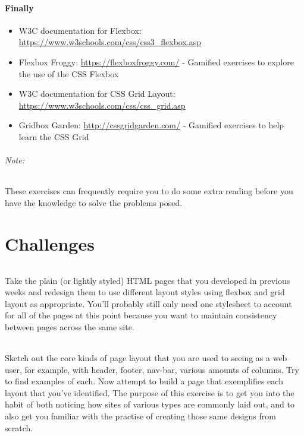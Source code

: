 \documentclass[10pt, a4paper]{article}
\begin{document}
\subsection*{Finally}
\begin{itemize}
\item W3C documentation for Flexbox: \url{https://www.w3schools.com/css/css3_flexbox.asp}
\item Flexbox Froggy: \url{https://flexboxfroggy.com/} - Gamified exercises to explore the use of the CSS Flexbox
\item W3C documentation for CSS Grid Layout: \url{https://www.w3schools.com/css/css_grid.asp}
\item Gridbox Garden: \url{http://cssgridgarden.com/} - Gamified exercises to help learn the CSS Grid
\end{itemize}

\paragraph{Note:} These exercises can frequently require you to do some extra reading before you have the knowledge to solve the problems posed.




\clearpage
\part{Challenges}
\paragraph{} Take the plain (or lightly styled) HTML pages that you developed in previous weeks and redesign them to use different layout styles using flexbox and grid layout as appropriate. You'll probably still only need one stylesheet to account for all of the pages at this point because you want to maintain consistency between pages across the same site.

\paragraph{} Sketch out the core kinds of page layout that you are used to seeing as a web user, for example, with header, footer, nav-bar, various amounts of columns. Try to find examples of each. Now attempt to build a page that exemplifies each layout that you've identified. The purpose of this exercise is to get you into the habit of both noticing how sites of various types are commonly laid out, and to also get you familiar with the practise of creating those same designs from scratch.
\end{document}
